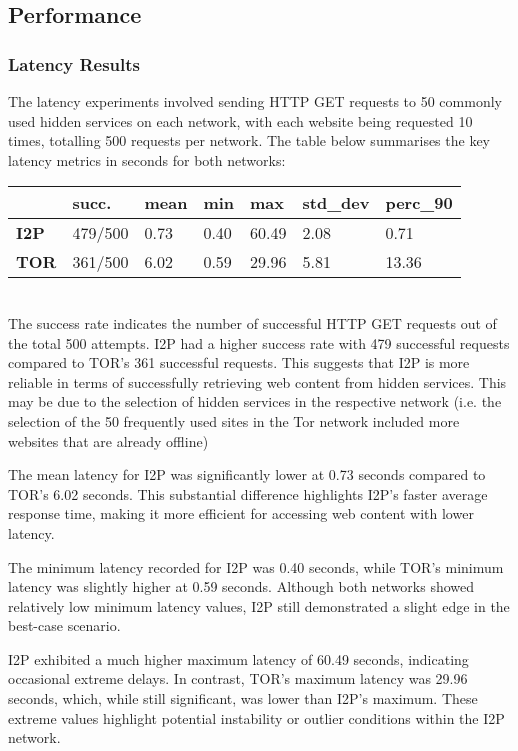 \documentclass[12pt,conference]{IEEEtran}
\begin{document}
\subsection{Performance}
\subsubsection{Latency Results}The latency experiments involved sending HTTP GET requests to 50 commonly used hidden services on each network, with each website being requested 10 times, totalling 500 requests per network. The table below summarises the key latency metrics in seconds for both networks:
\begin{table}[h]
\begin{tabular}{lllllll}
\textbf{}    & \textbf{succ.} & \textbf{mean} & \textbf{min} & \textbf{max} & \textbf{std\_dev} & \textbf{perc\_90} \\ \hline
\textbf{I2P} & 479/500        & 0.73          & 0.40         & 60.49        & 2.08              & 0.71              \\
\textbf{TOR} & 361/500        & 6.02          & 0.59         & 29.96        & 5.81              & 13.36            
\end{tabular}
\end{table}
\\
The success rate indicates the number of successful HTTP GET requests out of the total 500 attempts. I2P had a higher success rate with 479 successful requests compared to TOR's 361 successful requests. This suggests that I2P is more reliable in terms of successfully retrieving web content from hidden services. This may be due to the selection of hidden services in the respective network (i.e. the selection of the 50 frequently used sites in the Tor network included more websites that are already offline)

The mean latency for I2P was significantly lower at 0.73 seconds compared to TOR's 6.02 seconds. This substantial difference highlights I2P's faster average response time, making it more efficient for accessing web content with lower latency.

The minimum latency recorded for I2P was 0.40 seconds, while TOR's minimum latency was slightly higher at 0.59 seconds. Although both networks showed relatively low minimum latency values, I2P still demonstrated a slight edge in the best-case scenario.

I2P exhibited a much higher maximum latency of 60.49 seconds, indicating occasional extreme delays. In contrast, TOR's maximum latency was 29.96 seconds, which, while still significant, was lower than I2P's maximum. These extreme values highlight potential instability or outlier conditions within the I2P network.
\end{document}
